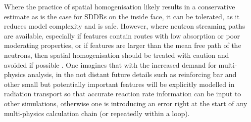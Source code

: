 Where the practice of spatial homogenisation likely results in a conservative estimate as is the case for SDDRs on the inside face, it can be tolerated, as it reduces model complexity and is safe. However, where neutron streaming paths are available, especially if features contain routes with low absorption or poor moderating properties, or if features are larger than the mean free path of the neutrons, then spatial homogenisation should be treated with caution and avoided if possible \cite{Pampin2007}. One imagines that with the increased demand for multi-physics analysis, in the not distant future details such as reinforcing bar and other small but potentially important features will be explicitly modelled in radiation transport so that accurate reaction rate information can be input to other simulations, otherwise one is introducing an error right at the start of any multi-physics calculation chain (or repeatedly within a loop).


